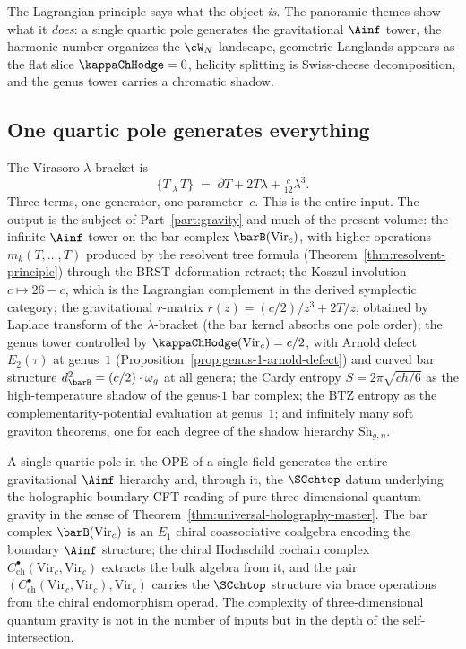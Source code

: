The Lagrangian principle says what the object \emph{is}.
The panoramic themes show what it \emph{does}:
a single quartic pole generates the gravitational $\Ainf$ tower,
the harmonic number organizes the $\cW_N$ landscape,
geometric Langlands appears as the flat slice $\kappaChHodge = 0$,
helicity splitting is Swiss-cheese decomposition,
and the genus tower carries a chromatic shadow.

\subsection{One quartic pole generates everything}

The Virasoro $\lambda$-bracket is
\[
 \{T\,{}_\lambda\,T\}
 \;=\;
 \partial T + 2T\lambda + \tfrac{c}{12}\lambda^3.
\]
Three terms, one generator, one parameter~$c$. This is the entire
input. The output is the subject of Part~\ref{part:gravity} and much of the present
volume: the infinite $\Ainf$ tower on the bar complex
$\barB(\mathrm{Vir}_c)$, with higher operations
$m_k(T,\ldots,T)$ produced by the resolvent tree formula
(Theorem~\ref{thm:resolvent-principle}) through the BRST deformation
retract; the Koszul involution $c \mapsto 26-c$, which is the
Lagrangian complement in the derived symplectic category; the
gravitational $r$-matrix $r(z) = (c/2)/z^3 + 2T/z$, obtained by
Laplace transform of the $\lambda$-bracket (the bar kernel absorbs one
pole order); the genus tower controlled by $\kappaChHodge(\mathrm{Vir}_c) =
c/2$, with Arnold defect $E_2(\tau)$ at genus~$1$
(Proposition~\ref{prop:genus-1-arnold-defect}) and curved bar
structure $d_{\barB}^2 = (c/2)\cdot\omega_g$ at all genera; the Cardy
entropy $S = 2\pi\sqrt{ch/6}$ as the high-temperature shadow of the
genus-$1$ bar complex; the BTZ entropy as the
complementarity-potential evaluation at genus~$1$; and infinitely many
soft graviton theorems, one for each degree of the shadow hierarchy
$\mathrm{Sh}_{g,n}$.

A single quartic pole in the OPE of a single field generates the
entire gravitational $\Ainf$ hierarchy and, through it, the
$\SCchtop$ datum underlying the holographic boundary-CFT reading
of pure three-dimensional quantum gravity in the sense of
Theorem~\ref{thm:universal-holography-master}. The bar
complex $\barB(\mathrm{Vir}_c)$ is an $E_1$ chiral coassociative
coalgebra encoding the boundary $\Ainf$ structure; the chiral
Hochschild cochain complex $C^\bullet_{\mathrm{ch}}(\mathrm{Vir}_c,
\mathrm{Vir}_c)$ extracts the bulk algebra from it, and the pair
$(C^\bullet_{\mathrm{ch}}(\mathrm{Vir}_c, \mathrm{Vir}_c),
\mathrm{Vir}_c)$ carries the $\SCchtop$ structure via brace
operations from the chiral endomorphism operad. The complexity of
three-dimensional quantum gravity is not in the number of inputs
but in the depth of the self-intersection.

